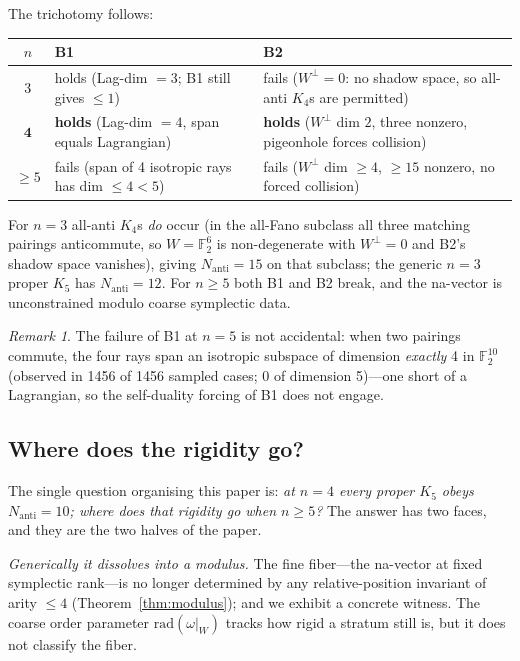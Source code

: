 \documentclass[11pt,a4paper]{article}
\theoremstyle{remark}
\newtheorem{remark}[theorem]{Remark}
\newcommand{\rad}{\mathrm{rad}}
\newcommand{\Nanti}{N_{\mathrm{anti}}}
\begin{document}
The trichotomy follows:
\begin{center}
\begin{tabular}{cp{5.5cm}p{5.5cm}}
\toprule
$n$ & B1 & B2 \\
\midrule
$3$ & holds (Lag-dim $=3$; B1 still gives $\le1$) &
  fails ($W^\perp=0$: no shadow space, so all-anti $K_4$s are permitted) \\[4pt]
$\mathbf{4}$ & \textbf{holds} (Lag-dim $=4$, span equals Lagrangian) &
  \textbf{holds} ($W^\perp$ dim $2$, three nonzero, pigeonhole forces collision) \\[4pt]
$\ge5$ & fails (span of 4 isotropic rays has dim $\le4<5$) &
  fails ($W^\perp$ dim $\ge4$, $\ge15$ nonzero, no forced collision) \\
\bottomrule
\end{tabular}
\end{center}

\noindent
For $n=3$ all-anti $K_4$s \emph{do} occur (in the all-Fano subclass all three
matching pairings anticommute, so $W=\mathbb F_2^6$ is non-degenerate with
$W^\perp=0$ and B2's shadow space vanishes), giving $\Nanti=15$ on that subclass;
the generic $n=3$ proper $K_5$ has $\Nanti=12$.  For $n\ge5$ both B1 and B2 break,
and the na-vector is unconstrained modulo coarse symplectic data.

\begin{remark}
The failure of B1 at $n=5$ is not accidental: when two pairings commute, the four
rays span an isotropic subspace of dimension \emph{exactly} 4 in $\mathbb F_2^{10}$
(observed in 1456 of 1456 sampled cases; 0 of dimension 5)---one short of a Lagrangian,
so the self-duality forcing of B1 does not engage.
\end{remark}

\subsection*{Where does the rigidity go?}

The single question organising this paper is: \emph{at $n=4$ every proper $K_5$ obeys
$\Nanti=10$; where does that rigidity go when $n\ge5$?} The answer has two faces, and
they are the two halves of the paper.

\emph{Generically it dissolves into a modulus.} The fine fiber---the na-vector at fixed
symplectic rank---is no longer determined by any relative-position invariant of arity
$\le4$ (Theorem~\ref{thm:modulus}); and we exhibit a concrete witness. The coarse
order parameter $\rad(\omega|_W)$ tracks how rigid a stratum still is, but it does not
classify the fiber.
\end{document}
